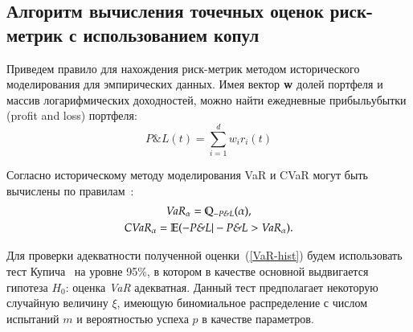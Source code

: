 

\subsection{Алгоритм вычисления точечных оценок риск-метрик с использованием копул}


Приведем правило для нахождения риск-метрик методом исторического моделирования для эмпирических данных. 
Имея вектор \textbf{w} долей %
портфеля и массив логарифмических доходностей, можно найти ежедневные прибыль\-убытки (profit and loss) портфеля:
\begin{equation} \label{PnL}
    \textit{P\&L}(t) = \sum_{i=1}^d w_i r_i(t)
\end{equation}

Согласно историческому методу моделирования VaR и CVaR могут быть вычислены по правилам~\cite{Lobanov2009}:
\begin{gather}
    \emph{VaR}_\alpha = \mathbb{Q}_{-\textit{P\&L}}  (\alpha),
    \label{VaR-hist} \\
	\emph{CVaR}_\alpha = \mathbb{E} (-\textit{P\&L}|-\textit{P\&L} > \emph{VaR}_\alpha).
	\label{ES-hist}
\end{gather}
%

Для проверки адекватности полученной оценки~(\ref{VaR-hist}) будем использовать тест Купича~\cite{Kupiec95, Travkin2013} на уровне 95\%, в котором в качестве основной выдвигается гипотеза $H_0$: оценка \emph{VaR} адекватная. 
Данный тест предполагает некоторую случайную величину $\xi$, имеющую биномиальное распределение с числом испытаний $m$ и вероятностью успеха $p$ в качестве параметров.


